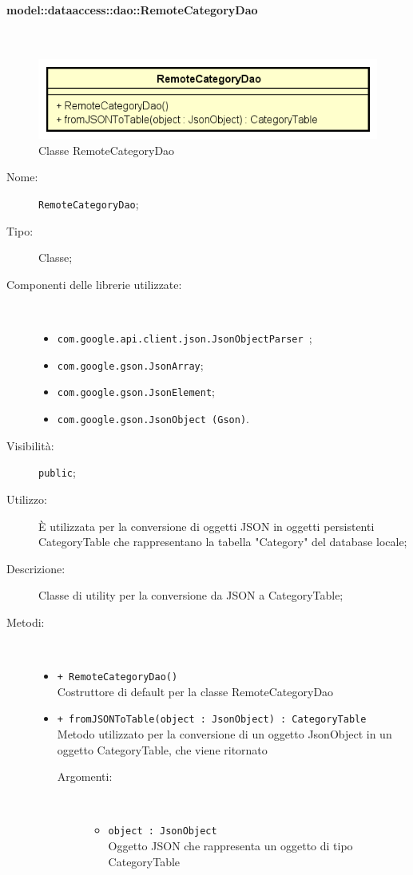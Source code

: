 \documentclass[../DefinizioneDiProdotto.tex]{subfiles}
\begin{document}
\paragraph{model::dataaccess::dao::RemoteCategoryDao}
\
\begin{figure}[H]
	\centering
	\includegraphics[width=\maxwidth]{img/RemoteCategoryDao.png}
	\caption{Classe RemoteCategoryDao}\label{fig:model::dataaccess::dao::RemoteCategoryDao} 
\end{figure}
\begin{description}
	\item[Nome:] \texttt{RemoteCategoryDao};
	\item[Tipo:] Classe;
	\item[Componenti delle librerie utilizzate:] \
	\begin{itemize}
		\item \texttt{com.google.api.client.json.JsonObjectParser
		};
		
		\item \texttt{com.google.gson.JsonArray};
		
		\item \texttt{com.google.gson.JsonElement};
		
		\item \texttt{com.google.gson.JsonObject (Gson)}.
		
	\end{itemize}
	\item[Visibilità:] \texttt{public};
	\item[Utilizzo:] È utilizzata per la conversione di oggetti JSON in oggetti persistenti CategoryTable che rappresentano la tabella "Category" del database locale;
	\item[Descrizione:] Classe di utility per la conversione da JSON a CategoryTable;
	\item[Metodi:] \
	\begin{itemize}
		\item \texttt{+ RemoteCategoryDao()}\\
		Costruttore di default per la classe RemoteCategoryDao
		\item \texttt{+ fromJSONToTable(object : JsonObject) : CategoryTable}\\
		Metodo utilizzato per la conversione di un oggetto JsonObject in un oggetto CategoryTable, che viene ritornato
		\begin{description}
			\item[Argomenti:] \
			\begin{itemize}
				\item \texttt{object : JsonObject}\\
				Oggetto JSON che rappresenta un oggetto di tipo CategoryTable\end{itemize}
		\end{description}
	\end{itemize}
\end{description}
\end{document}
